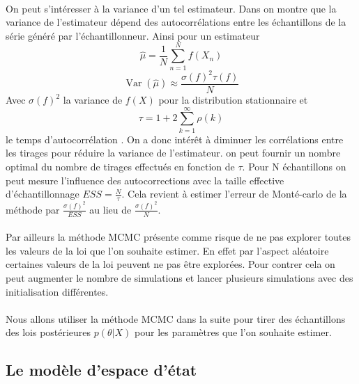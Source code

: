 \documentclass{article}
\theoremstyle{definition}
\theoremstyle{remark}
\begin{document}
{\paragraph{}
On peut s'intéresser à la variance d'un tel estimateur. Dans \cite{coursgibbs} on montre que la variance de l'estimateur dépend
des autocorrélations entre les échantillons de la série généré par l'échantillonneur. 
Ainsi pour un estimateur 
\begin{equation}
	\hat{\mu}=\frac{1}{N} \sum_{n=1}^{N} f\left(X_{n}\right)
\end{equation}
\begin{equation}
	\operatorname{Var}(\hat{\mu}) \approx \frac{\sigma(f)^{2} \tau(f)}{N}
	\end{equation}
Avec $\sigma(f)^{2}$ la variance de $f(X)$ pour la distribution stationnaire et $$\tau=1+2 \sum_{k=1}^{\infty} \rho(k) $$ 
le \og{}temps d'autocorrélation \fg. On a donc intérêt à diminuer les corrélations entre les tirages pour réduire la variance de l'estimateur.
on peut fournir un nombre optimal du nombre de tirages effectués en fonction de $\tau$.
Pour N échantillons on peut mesure l'influence des autocorrections avec la taille effective d'échantillonnage
$ESS = \frac{N}{\tau}$. Cela revient à estimer l'erreur de Monté-carlo de la méthode par $\frac{\sigma(f)^{2}}{ESS}$ 
au lieu de $\frac{\sigma(f)^{2}}{N}$. 

\paragraph{}
Par ailleurs la méthode MCMC présente comme risque de ne pas explorer toutes les valeurs de la loi que l'on souhaite estimer. 
En effet par l'aspect aléatoire certaines valeurs de la loi peuvent ne pas être explorées. Pour contrer cela on peut augmenter le nombre de simulations 
et lancer plusieurs simulations avec des initialisation différentes. 
\paragraph{}
Nous allons utiliser la méthode MCMC dans la suite pour tirer des échantillons des lois postérieures $p(\theta|X)$ pour les paramètres que l'on souhaite estimer.
\subsection{Le modèle d'espace d'état}


}
\end{document}
